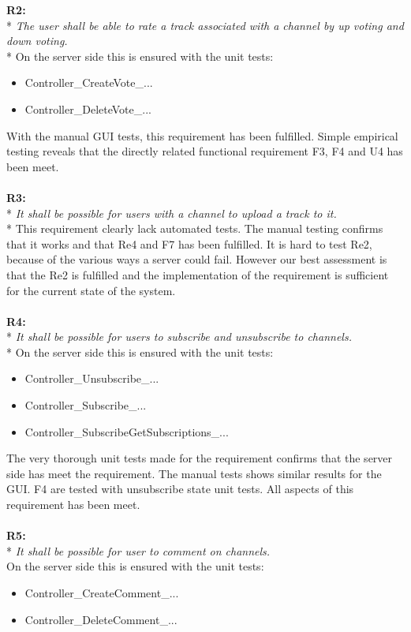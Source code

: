 \documentclass[a4paper,11pt,report]{article}
\begin{document}
\textbf{R2:} \\*
\textit{The user shall be able to rate a track associated with a channel by up voting and down voting.} \\*
On the server side this is ensured with the unit tests:
\begin{itemize}
\item Controller\_CreateVote\_...
\item Controller\_DeleteVote\_...
\end{itemize}
With the manual GUI tests, this requirement has been fulfilled. Simple empirical testing reveals that the directly related functional requirement F3, F4 and U4 has been meet. \\ \\
\textbf{R3:} \\*
\textit{It shall be possible for users with a channel to upload a track to it.} \\*
This requirement clearly lack automated tests. The manual testing confirms that it works and that Re4 and F7 has been fulfilled. It is hard to test Re2, because of the various ways a server could fail. However our best assessment is that the Re2 is fulfilled and the implementation of the requirement is sufficient for the current state of the system. \\ \\
\textbf{R4:} \\*
\textit{It shall be possible for users to subscribe and unsubscribe to channels.} \\*
On the server side this is ensured with the unit tests:
\begin{itemize}
\item Controller\_Unsubscribe\_...
\item Controller\_Subscribe\_...
\item Controller\_SubscribeGetSubscriptions\_...
\end{itemize}
The very thorough unit tests made for the requirement confirms that the server side has meet the requirement. The manual tests shows similar results for the GUI. F4 are tested with unsubscribe state unit tests. All aspects of this requirement has been meet. \\ \\
\textbf{R5:} \\*
\textit{It shall be possible for user to comment on channels.} \\
On the server side this is ensured with the unit tests:
\begin{itemize}
\item Controller\_CreateComment\_...
\item Controller\_DeleteComment\_...
\end{itemize}
\end{document}
